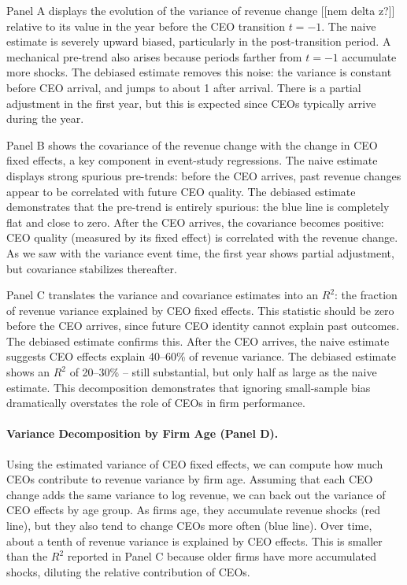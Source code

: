 \documentclass[11pt,a4paper]{article}
\begin{document}
Panel A displays the evolution of the variance of revenue change [[nem delta z?]] relative to its value in the year before the CEO transition $t = - 1$. The naive estimate is severely upward biased, particularly in the post-transition period. A mechanical pre-trend also arises because periods farther from $t=-1$ accumulate more shocks. The debiased estimate removes this noise: the variance is constant before CEO arrival, and jumps to about 1 after arrival. There is a partial adjustment in the first year, but this is expected since CEOs typically arrive during the year. 

Panel B shows the covariance of the revenue change with the change in CEO fixed effects, a key component in event-study regressions. The naive estimate displays strong spurious pre-trends: before the CEO arrives, past revenue changes appear to be correlated with future CEO quality. The debiased estimate demonstrates that the pre-trend is entirely spurious: the blue line is completely flat and close to zero. After the CEO arrives, the covariance becomes positive: CEO quality (measured by its fixed effect) is correlated with the revenue change. As we saw with the variance event time, the first year shows partial adjustment, but covariance stabilizes thereafter.

Panel C translates the variance and covariance estimates into an $R^2$: the fraction of revenue variance explained by CEO fixed effects. This statistic should be zero before the CEO arrives, since future CEO identity cannot explain past outcomes. The debiased estimate confirms this. After the CEO arrives, the naive estimate suggests CEO effects explain 40--60\% of revenue variance. The debiased estimate shows an $R^2$ of 20--30\% -- still substantial, but only half as large as the naive estimate. This decomposition demonstrates that ignoring small-sample bias dramatically overstates the role of CEOs in firm performance.

\paragraph{Variance Decomposition by Firm Age (Panel D).} Using the estimated variance of CEO fixed effects, we can compute how much CEOs contribute to revenue variance by firm age. Assuming that each CEO change adds the same variance to log revenue, we can back out the variance of CEO effects by age group. As firms age, they accumulate revenue shocks (red line), but they also tend to change CEOs more often (blue line). Over time, about a tenth of revenue variance is explained by CEO effects. This is smaller than the $R^2$ reported in Panel C because older firms have more accumulated shocks, diluting the relative contribution of CEOs.
\end{document}
